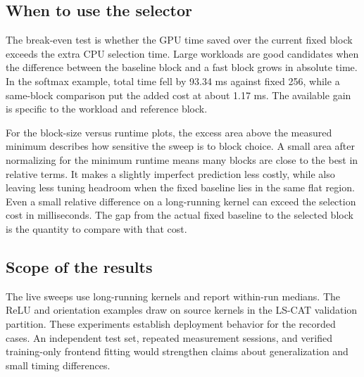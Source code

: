 \documentclass[11pt,letterpaper]{article}
\begin{document}

\subsection{When to use the selector}

The break-even test is whether the GPU time saved over the current fixed block exceeds the extra CPU
selection time. Large workloads are good candidates when the difference between the baseline block and a
fast block grows in absolute time. In the softmax example, total time fell by 93.34 ms against fixed 256,
while a same-block comparison put the added cost at about 1.17 ms. The available gain is specific to the
workload and reference block.

For the block-size versus runtime plots, the excess area above the measured minimum describes how sensitive
the sweep is to block choice. A small area after normalizing for the minimum runtime means many blocks are
close to the best in relative terms. It makes a slightly imperfect prediction less costly, while also
leaving less tuning headroom when the fixed baseline lies in the same flat region. Even a small relative
difference on a long-running kernel can exceed the selection cost in milliseconds. The gap from the actual
fixed baseline to the selected block is the quantity to compare with that cost.

\subsection{Scope of the results}

The live sweeps use long-running kernels and report within-run medians. The ReLU and orientation examples
draw on source kernels in the LS-CAT validation partition. These experiments establish deployment behavior
for the recorded cases. An independent test set, repeated measurement sessions, and verified training-only
frontend fitting would strengthen claims about generalization and small timing differences.

\end{document}
